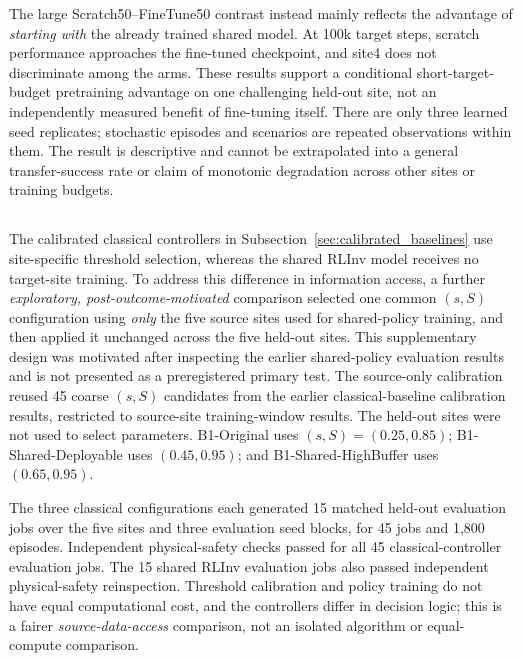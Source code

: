 \begin{revisedblock}
The large Scratch50--FineTune50 contrast instead mainly reflects the
advantage of \emph{starting with} the already trained shared model.
At 100k target steps, scratch performance approaches the fine-tuned
checkpoint, and site4 does not discriminate among the arms. These
results support a conditional short-target-budget pretraining
advantage on one challenging held-out site, not an independently
measured benefit of fine-tuning itself. There are only three learned
seed replicates; stochastic episodes and scenarios are repeated
observations within them. The result is descriptive and cannot be
extrapolated into a general transfer-success rate or claim of
monotonic degradation across other sites or training budgets.
\end{revisedblock}

\subsection[Source-Calibrated Classical Baselines Versus Shared RLInv]
{}
\label{sec:g5b_shared_b1}
\begin{revisedblock}
The calibrated classical controllers in
Subsection~\ref{sec:calibrated_baselines} use site-specific threshold
selection, whereas the shared RLInv model receives no target-site
training. To address this difference in information access, a further
\emph{exploratory, post-outcome-motivated} comparison selected one
common $(s,S)$ configuration using \emph{only} the five source sites used for shared-policy training, and then applied it unchanged across the five held-out sites.
This supplementary design was motivated after inspecting the earlier shared-policy evaluation results and is not presented as a preregistered primary test.
The source-only calibration reused 45 coarse $(s,S)$ candidates
from the earlier classical-baseline calibration results, restricted to source-site
training-window results. The held-out sites were not used to select
parameters. B1-Original uses $(s,S)=(0.25,0.85)$;
B1-Shared-Deployable uses $(0.45,0.95)$; and
B1-Shared-HighBuffer uses $(0.65,0.95)$.

The three classical configurations each generated 15 matched
held-out evaluation jobs over the five sites and three evaluation
seed blocks, for 45 jobs and 1,800 episodes. Independent physical-safety checks passed for all
45 classical-controller evaluation jobs.
The 15 shared RLInv evaluation jobs also passed
independent physical-safety reinspection. Threshold calibration and policy
training do not have equal computational cost, and the controllers
differ in decision logic; this is a fairer \emph{source-data-access}
comparison, not an isolated algorithm or equal-compute comparison.
\end{revisedblock}

